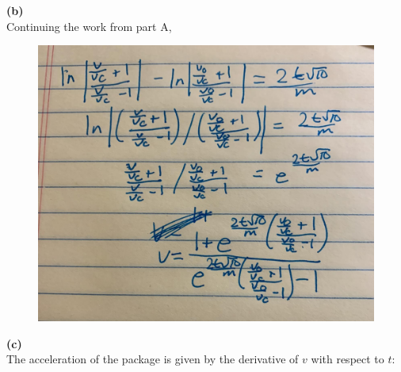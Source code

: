 \documentclass{article}
\begin{document}
    \textbf{(b)} \\
    Continuing the work from part A,

    \begin{figure}[hbt!]
        \centering
        \includegraphics[scale=0.1]{parachutist}
    \end{figure}

    \textbf{(c)} \\
    The acceleration of the package is given by the derivative of $v$ with respect to $t$:

\end{document}
